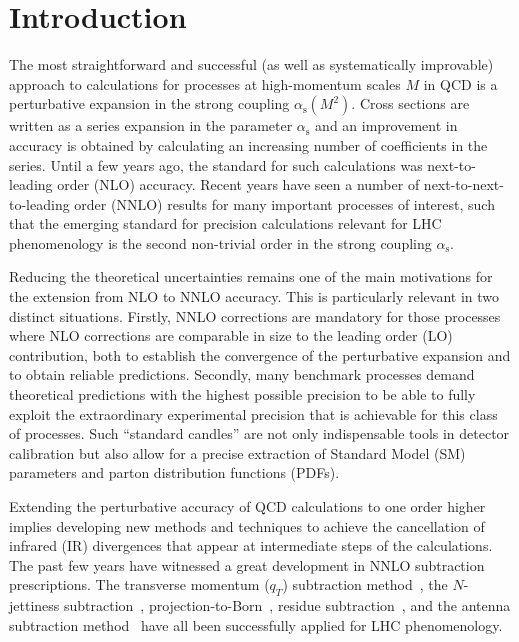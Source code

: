 \documentclass[12pt]{article}
\DeclareRobustCommand{\alphas}{\ensuremath{\alpha_{\mathrm{s}}}\xspace}
\DeclareRobustCommand{\as}{\alphas}
\DeclareRobustCommand{\qt}{\ensuremath{q_T}\xspace}
\begin{document}
\begin{titlepage}
\begin{quote}
\end{quote}
\end{titlepage}
\setcounter{footnote}{1}
\renewcommand{\thefootnote}{\fnsymbol{footnote}}


\section{Introduction}
\label{sec:intro}

The most straightforward and successful (as well as systematically improvable) approach to calculations for processes at high-momentum scales $M$ in QCD is a perturbative expansion in the strong coupling $\as(M^{2})$. Cross sections are written as a series expansion in the parameter $\as$ and an improvement in accuracy is obtained by calculating an increasing number of coefficients in the series. Until a few years ago, the standard for such calculations was next-to-leading order (NLO) accuracy. Recent years have seen a number of next-to-next-to-leading order (NNLO) results for many important processes of interest, such that the emerging standard for precision calculations relevant for LHC phenomenology is the second non-trivial order in the strong coupling $\as$.

Reducing the theoretical uncertainties remains one of the main motivations for the extension from NLO to NNLO accuracy. This is particularly relevant in two distinct situations. Firstly, NNLO corrections are mandatory for those processes where NLO corrections are comparable in size to the leading order (LO) contribution, both to establish the convergence of the perturbative expansion and to obtain reliable predictions. Secondly, many benchmark processes demand theoretical predictions with the highest possible precision to be able to fully exploit the extraordinary experimental precision that is achievable for this class of processes. Such ``standard candles'' are not only indispensable tools in detector calibration but also allow for a precise extraction of Standard Model (SM) parameters and parton distribution functions (PDFs).

Extending the perturbative accuracy of QCD calculations to one order higher implies developing new methods and techniques to achieve the cancellation of infrared (IR) divergences that appear at intermediate steps of the calculations. The past few years have witnessed a great development in NNLO subtraction prescriptions. The transverse momentum ($\qt$) subtraction method~\cite{Catani:2007vq,Bozzi:2005wk,Bonciani:2015sha}, the $N$-jettiness subtraction~\cite{Boughezal:2015eha, Gaunt:2015pea}, projection-to-Born~\cite{Cacciari:2015jma}, residue subtraction~\cite{Czakon:2011ve,Boughezal:2011jf}, and the antenna subtraction method~\cite{Antenna:method} have all been successfully applied for LHC phenomenology. 
\end{document}
